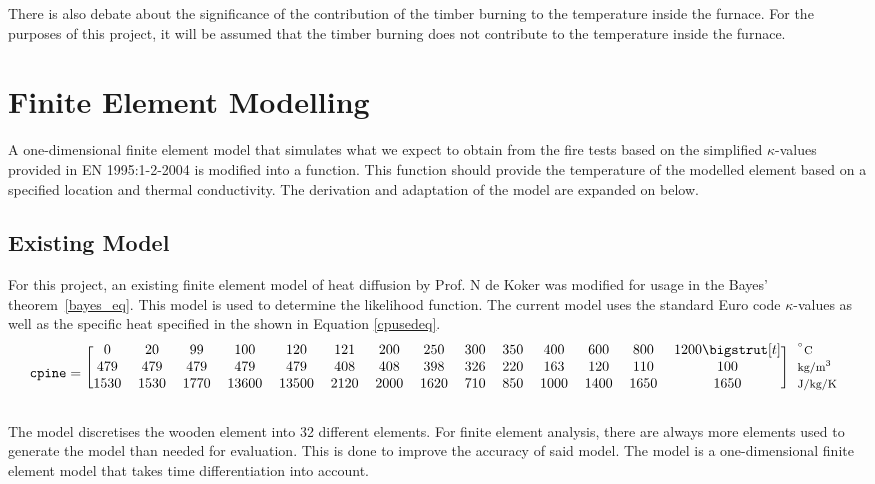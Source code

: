 	There is also debate about the significance of the contribution of the timber burning to the temperature inside the furnace. 
	For the purposes of this project, it will be assumed that the timber burning does not contribute to the temperature inside the furnace.
	
\section{Finite Element Modelling}\label{femexpl}
A one-dimensional finite element model that simulates what we expect to obtain from the fire tests based on the simplified $\kappa$-values provided in EN 1995:1-2-2004 is modified into a function.
This function should provide the temperature of the modelled element based on a specified location and thermal conductivity.
The derivation and adaptation of the model are expanded on below.

\subsection{Existing Model}
	For this project, an existing finite element model of heat diffusion by Prof. N de Koker was modified for usage in the Bayes' theorem~\ref{bayes_eq}. 
	This model is used to determine the likelihood function. 
	The current model uses the standard Euro code $\kappa$-values as well as the specific heat specified in the \citep{Euro:2004} shown in Equation \ref{cpusedeq}.
\begin{equation} \label{cpusedeq}
\centering
  \texttt{cpine}=
  \begin{blockarray}{*{14}{c} l}
    \begin{block}{[*{14}{c}]>{$\footnotesize}l<{$}}
      0 & 20 & 99&100& 120 & 121 & 200 & 250 & 300 & 350 & 400 & 600& 800 & 1200 \bigstrut[t]& $^{^\circ}\text{C}$ \\
      479 & 479& 479 & 479 &  479 & 408 & 408 & 398 & 326&  220 &163 &  120 & 110 & 100 & $\text{kg/m}^3$ \\
     1530 &1530 &1770 &13600& 13500& 2120& 2000& 1620 & 710 & 850 &1000& 1400 &1650& 1650 & J/kg/K \\
    \end{block}
  \end{blockarray}
\end{equation}
	
	The model discretises the wooden element into 32 different elements. For finite element analysis, there are always more elements used to generate the model than needed for evaluation. This is done to improve the accuracy of said model.
	The model is a one-dimensional finite element model that takes time differentiation into account.
	
